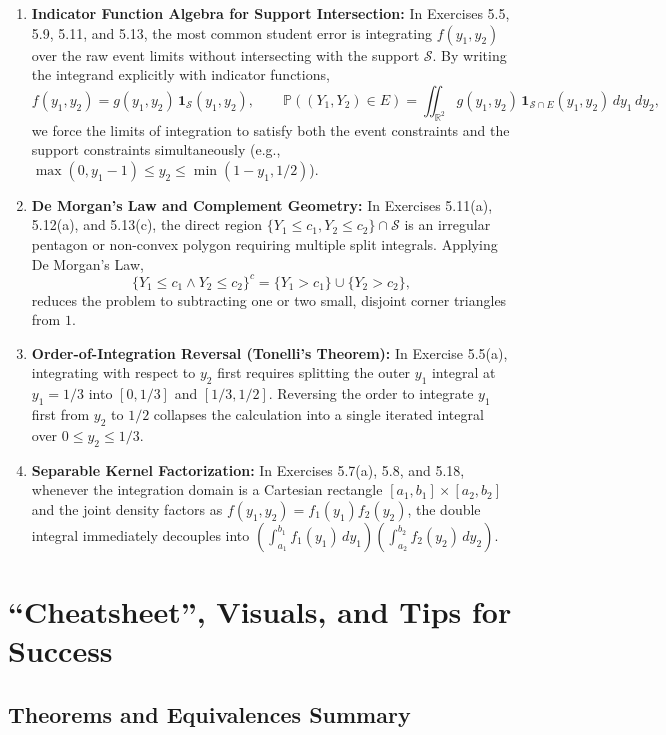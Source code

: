 \documentclass[11pt, letterpaper]{article}
\theoremstyle{definition}
\theoremstyle{remark}
\begin{document}
\begin{enumerate}[label=\textbf{\arabic*.}]
    \item \textbf{Indicator Function Algebra for Support Intersection:}
    In Exercises 5.5, 5.9, 5.11, and 5.13, the most common student error is integrating $f(y_1, y_2)$ over the raw event limits without intersecting with the support $\mathcal{S}$. By writing the integrand explicitly with indicator functions,
    \[
        f(y_1, y_2) = g(y_1, y_2)\, \mathbf{1}_{\mathcal{S}}(y_1, y_2), \qquad \mathbb{P}((Y_1, Y_2) \in E) = \iint_{\mathbb{R}^2} g(y_1, y_2)\, \mathbf{1}_{\mathcal{S} \cap E}(y_1, y_2)\, dy_1\, dy_2,
    \]
    we force the limits of integration to satisfy both the event constraints and the support constraints simultaneously (e.g., $\max(0, y_1 - 1) \le y_2 \le \min(1 - y_1, 1/2)$).
    \item \textbf{De Morgan's Law and Complement Geometry:}
    In Exercises 5.11(a), 5.12(a), and 5.13(c), the direct region $\{Y_1 \le c_1, Y_2 \le c_2\} \cap \mathcal{S}$ is an irregular pentagon or non-convex polygon requiring multiple split integrals. Applying De Morgan's Law,
    \[
        \{Y_1 \le c_1 \land Y_2 \le c_2\}^c = \{Y_1 > c_1\} \cup \{Y_2 > c_2\},
    \]
    reduces the problem to subtracting one or two small, disjoint corner triangles from $1$.
    \item \textbf{Order-of-Integration Reversal (Tonelli's Theorem):}
    In Exercise 5.5(a), integrating with respect to $y_2$ first requires splitting the outer $y_1$ integral at $y_1 = 1/3$ into $[0, 1/3]$ and $[1/3, 1/2]$. Reversing the order to integrate $y_1$ first from $y_2$ to $1/2$ collapses the calculation into a single iterated integral over $0 \le y_2 \le 1/3$.
    \item \textbf{Separable Kernel Factorization:}
    In Exercises 5.7(a), 5.8, and 5.18, whenever the integration domain is a Cartesian rectangle $[a_1, b_1] \times [a_2, b_2]$ and the joint density factors as $f(y_1, y_2) = f_1(y_1)f_2(y_2)$, the double integral immediately decouples into $\left(\int_{a_1}^{b_1} f_1(y_1)\,dy_1\right)\left(\int_{a_2}^{b_2} f_2(y_2)\,dy_2\right)$.
\end{enumerate}

\newpage

\section{``Cheatsheet'', Visuals, and Tips for Success}

\subsection{Theorems and Equivalences Summary}
\end{document}
